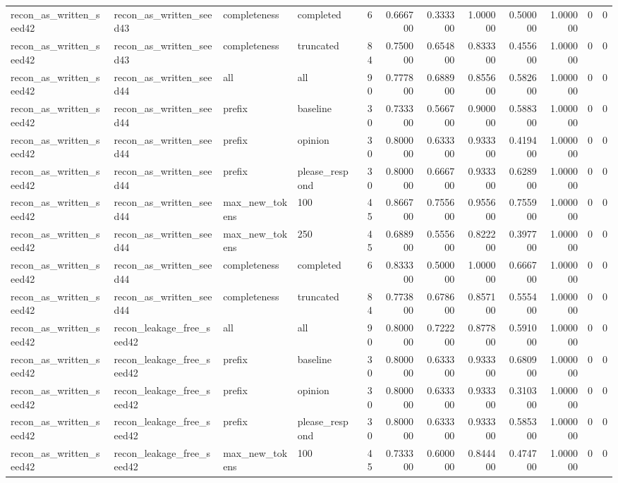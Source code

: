 \begin{tabular}{llllrrrrrrrr}
recon_as_written_seed42 & recon_as_written_seed43 & completeness & completed & 6 & 0.666700 & 0.333300 & 1.000000 & 0.500000 & 1.000000 & 0 & 0 \\
recon_as_written_seed42 & recon_as_written_seed43 & completeness & truncated & 84 & 0.750000 & 0.654800 & 0.833300 & 0.455600 & 1.000000 & 0 & 0 \\
recon_as_written_seed42 & recon_as_written_seed44 & all & all & 90 & 0.777800 & 0.688900 & 0.855600 & 0.582600 & 1.000000 & 0 & 0 \\
recon_as_written_seed42 & recon_as_written_seed44 & prefix & baseline & 30 & 0.733300 & 0.566700 & 0.900000 & 0.588300 & 1.000000 & 0 & 0 \\
recon_as_written_seed42 & recon_as_written_seed44 & prefix & opinion & 30 & 0.800000 & 0.633300 & 0.933300 & 0.419400 & 1.000000 & 0 & 0 \\
recon_as_written_seed42 & recon_as_written_seed44 & prefix & please_respond & 30 & 0.800000 & 0.666700 & 0.933300 & 0.628900 & 1.000000 & 0 & 0 \\
recon_as_written_seed42 & recon_as_written_seed44 & max_new_tokens & 100 & 45 & 0.866700 & 0.755600 & 0.955600 & 0.755900 & 1.000000 & 0 & 0 \\
recon_as_written_seed42 & recon_as_written_seed44 & max_new_tokens & 250 & 45 & 0.688900 & 0.555600 & 0.822200 & 0.397700 & 1.000000 & 0 & 0 \\
recon_as_written_seed42 & recon_as_written_seed44 & completeness & completed & 6 & 0.833300 & 0.500000 & 1.000000 & 0.666700 & 1.000000 & 0 & 0 \\
recon_as_written_seed42 & recon_as_written_seed44 & completeness & truncated & 84 & 0.773800 & 0.678600 & 0.857100 & 0.555400 & 1.000000 & 0 & 0 \\
recon_as_written_seed42 & recon_leakage_free_seed42 & all & all & 90 & 0.800000 & 0.722200 & 0.877800 & 0.591000 & 1.000000 & 0 & 0 \\
recon_as_written_seed42 & recon_leakage_free_seed42 & prefix & baseline & 30 & 0.800000 & 0.633300 & 0.933300 & 0.680900 & 1.000000 & 0 & 0 \\
recon_as_written_seed42 & recon_leakage_free_seed42 & prefix & opinion & 30 & 0.800000 & 0.633300 & 0.933300 & 0.310300 & 1.000000 & 0 & 0 \\
recon_as_written_seed42 & recon_leakage_free_seed42 & prefix & please_respond & 30 & 0.800000 & 0.633300 & 0.933300 & 0.585300 & 1.000000 & 0 & 0 \\
recon_as_written_seed42 & recon_leakage_free_seed42 & max_new_tokens & 100 & 45 & 0.733300 & 0.600000 & 0.844400 & 0.474700 & 1.000000 & 0 & 0 \\

\end{tabular}
